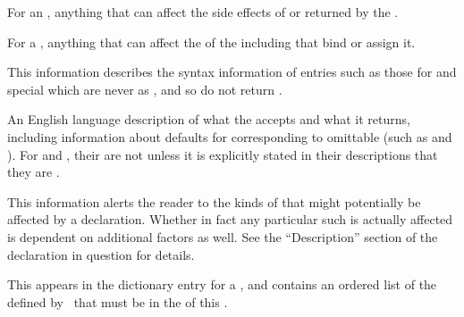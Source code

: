 For an , anything that can affect the side effects of
or  returned by the .

For a , anything that can affect the  of the 
including  that bind or assign it.

\endsubsubsection%


This information describes the syntax information of entries such as those for
 and special  which are never 
as , and so do not return .

\endsubsubsection%


An English language description of what  the  accepts
and what  it returns, including information about defaults for 
corresponding to omittable 
(such as  and ).
For  and ,
their  are not  unless it is explicitly stated in their
descriptions that they are .

\endsubsubsection%


This information alerts the reader to the kinds of  that might 
potentially be affected by a declaration.  Whether in fact any particular such
 is actually affected is dependent on additional factors as well.
See the ``Description'' section of the declaration in question for details.

\endsubsubsection%


This appears in the dictionary entry for a ,
and contains an ordered list of the  defined 
by \clisp\ that must be in the  of this .

